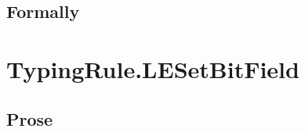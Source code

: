 \subsection{Formally}
\begin{mathpar}
\end{mathpar}


\section{TypingRule.LESetBitField \label{sec:TypingRule.LESetBitField}}
\subsection{Prose}
